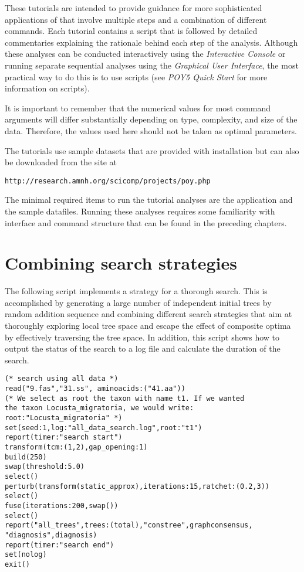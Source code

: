 These tutorials are intended to provide guidance for more sophisticated applications of \poy that involve multiple steps and a combination of different commands. Each tutorial contains a \poy script that is followed by detailed commentaries explaining the rationale behind each step of the analysis. Although these analyses can be conducted interactively using the \emph{Interactive Console} or running separate sequential analyses using the \emph{Graphical User Interface}, the most practical way to do this is to use \poy scripts (see \emph{ POY5 Quick Start} for more information on \poy scripts).

It is important to remember that the numerical values for most command arguments will differ substantially depending on type, complexity, and size of the data. Therefore, the values used here should not be taken as optimal parameters.

The tutorials use sample datasets that are provided with \poy installation but can also be downloaded from the \poy site at
\begin{center}
\texttt{http://research.amnh.org/scicomp/projects/poy.php}
\end{center}
The minimal required items to run the tutorial analyses are the \poy application and the sample datafiles. Running these analyses requires some familiarity with \poy interface and command structure that can be found in the preceding chapters.

\section{Combining  search strategies}{\label{tutorial1}}
The following script implements a strategy for a thorough search. This is accomplished by generating a large number of independent initial trees by random addition sequence and combining different search strategies that aim at thoroughly exploring local tree space and escape the effect of composite optima by effectively traversing the tree space. In addition, this script shows how to output the status of the search to a log file and calculate the duration of the search. 

\begin{verbatim}
(* search using all data *)
read("9.fas","31.ss", aminoacids:("41.aa"))
(* We select as root the taxon with name t1. If we wanted
the taxon Locusta_migratoria, we would write:
root:"Locusta_migratoria" *)
set(seed:1,log:"all_data_search.log",root:"t1")
report(timer:"search start")
transform(tcm:(1,2),gap_opening:1)
build(250)
swap(threshold:5.0)
select()
perturb(transform(static_approx),iterations:15,ratchet:(0.2,3))
select()
fuse(iterations:200,swap())
select()
report("all_trees",trees:(total),"constree",graphconsensus,
"diagnosis",diagnosis)
report(timer:"search end")
set(nolog)
exit()
\end{verbatim}

